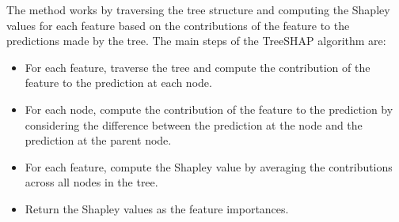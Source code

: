 The method works by traversing the tree structure and computing the Shapley values for each feature based on the contributions of the feature to the predictions made by the tree. The main steps of the TreeSHAP algorithm are:
\begin{itemize}
    \item For each feature, traverse the tree and compute the contribution of the feature to the prediction at each node.
    \item For each node, compute the contribution of the feature to the prediction by considering the difference between the prediction at the node and the prediction at the parent node.
    \item For each feature, compute the Shapley value by averaging the contributions across all nodes in the tree.
    \item Return the Shapley values as the feature importances.
\end{itemize} 

